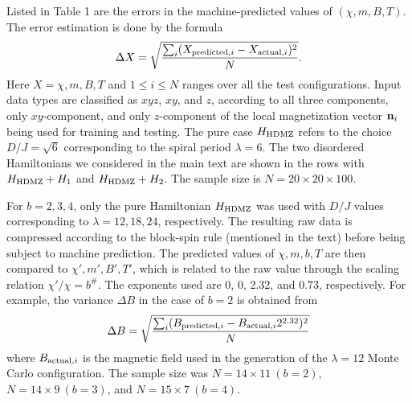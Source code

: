 \documentclass[reprint,amsmath,amssymb,aps,showpacs,twocolumn,superscriptaddress,prb]{revtex4-1}
\newcommand{\ba}{\begin{eqnarray}}
\newcommand{\ea}{\end{eqnarray}}
\renewcommand{\v}[1]{{\bf #1}}
\begin{document}
Listed in Table 1 are the errors in the machine-predicted values of $(\chi, m, B, T)$. The error estimation is done by the formula 
%
\ba \Delta X = \sqrt{ { \sum_i (X_{{\rm predicted}, i} - X_{{\rm actual}, i} )^2 \over N} }. \ea
%
Here $X=\chi, m, B, T$ and $1\le i \le N$ ranges over all the test configurations. Input data types are classified as $xyz$, $xy$, and $z$, according to all three components, only $xy$-component, and only $z$-component of the local magnetization vector $\v n_i$ being used for training and testing. The pure case $H_{\rm HDMZ}$ refers to the choice $D/J=\sqrt{6}$ corresponding to the spiral period $\lambda=6$. The two disordered Hamiltonians we considered in the main text are shown in the rows with $H_{\rm HDMZ}+ H_1$ and $H_{\rm HDMZ}+ H_2$. The sample size is $N= 20\times 20 \times 100$. 

For $b=2,3,4$, only the pure Hamiltonian $H_{\rm HDMZ}$ was used with $D/J$ values corresponding to $\lambda=12,18,24$, respectively. The resulting raw data is compressed according to the block-spin rule (mentioned in the text) before being subject to machine prediction. The predicted values of $\chi, m, b, T$ are then compared to $\chi', m', B', T'$, which is related to the raw value through the scaling relation $\chi'/\chi = b^\#$. The exponents used are 0, 0, 2.32, and 0.73, respectively. For example, the variance $\Delta B$ in the case of $b=2$ is obtained from
%
\ba \Delta B = \sqrt{ { \sum_i (B_{{\rm predicted}, i} - B_{{\rm actual}, i} 2^{2.32} )^2 \over N} } \ea
%
where $B_{{\rm actual}, i}$ is the magnetic field used in the generation of the $\lambda=12$ Monte Carlo configuration. The sample size was $N=14\times 11 ~ (b=2)$, $N=14\times 9 ~ (b=3)$, and $N=15\times 7 ~ (b=4)$. 

\end{document}
